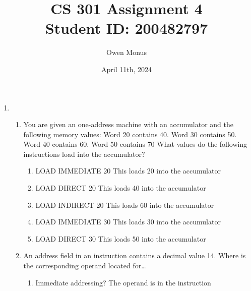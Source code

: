 \documentclass{article}
\begin{document}
\title{CS 301 Assignment 4\\[0.5cm]\large Student ID: 200482797}
\author{Owen Monus}
\date{April 11th, 2024}

\maketitle

\begin{enumerate}
	\item
	      \begin{enumerate}
		      \item You are given an one-address machine with an accumulator and the following memory
		            values:
		            \newline Word 20 contains 40.
		            \newline Word 30 contains 50.
		            \newline Word 40 contains 60.
		            \newline Word 50 contains 70
		            \newline
		            \newline
		            What values do the following instructions load into the accumulator?
		            \begin{enumerate}
			            \item LOAD IMMEDIATE 20
			                  \newline This loads 20 into the accumulator

			            \item LOAD DIRECT 20
			                  \newline This loads 40 into the accumulator

			            \item LOAD INDIRECT 20
			                  \newline This loads 60 into the accumulator

			            \item LOAD IMMEDIATE 30
			                  \newline This loads 30 into the accumulator

			            \item LOAD DIRECT 30
			                  \newline This loads 50 into the accumulator

		            \end{enumerate}

		      \item An address field in an instruction contains a decimal value 14. Where is the corresponding
		            operand located for\dots
		            \begin{enumerate}
			            \item Immediate addressing?
			                  \newline The operand is in the instruction


\end{enumerate}
\end{enumerate}
\end{enumerate}
\end{document}
